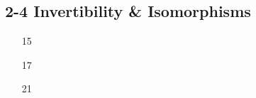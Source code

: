  \subsection*{2-4 Invertibility \& Isomorphisms}
 \begin{enumerate}
 	\item[15] 
 	\item[17] 
 	\item[21]  
 \end{enumerate}

